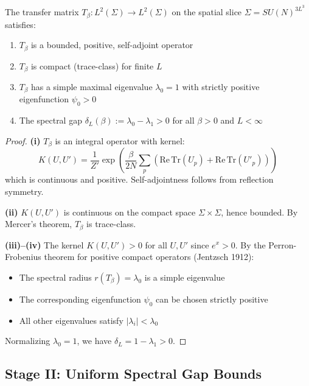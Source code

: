 \begin{theorem}
\label{thm:transfer-rigorous}
The transfer matrix $T_\beta : L^2(\Sigma) \to L^2(\Sigma)$ on the spatial 
slice $\Sigma = SU(N)^{3L^3}$ satisfies:
\begin{enumerate}
\item[(i)] $T_\beta$ is a bounded, positive, self-adjoint operator
\item[(ii)] $T_\beta$ is compact (trace-class) for finite $L$
\item[(iii)] $T_\beta$ has a simple maximal eigenvalue $\lambda_0 = 1$ with 
strictly positive eigenfunction $\psi_0 > 0$
\item[(iv)] The spectral gap $\delta_L(\beta) := \lambda_0 - \lambda_1 > 0$ 
for all $\beta > 0$ and $L < \infty$
\end{enumerate}
\end{theorem}

\begin{proof}
\textbf{(i)} $T_\beta$ is an integral operator with kernel:
\[
K(U, U') = \frac{1}{Z'} \exp\left(\frac{\beta}{2N}\sum_p (\mathrm{Re}\,\mathrm{Tr}(U_p) + \mathrm{Re}\,\mathrm{Tr}(U'_p))\right)
\]
which is continuous and positive. Self-adjointness follows from reflection symmetry.

\textbf{(ii)} $K(U, U')$ is continuous on the compact space $\Sigma \times \Sigma$, 
hence bounded. By Mercer's theorem, $T_\beta$ is trace-class.

\textbf{(iii)--(iv)} The kernel $K(U, U') > 0$ for all $U, U'$ since $e^x > 0$. 
By the Perron-Frobenius theorem for positive compact operators (Jentzsch 1912):
\begin{itemize}
\item The spectral radius $r(T_\beta) = \lambda_0$ is a simple eigenvalue
\item The corresponding eigenfunction $\psi_0$ can be chosen strictly positive
\item All other eigenvalues satisfy $|\lambda_i| < \lambda_0$
\end{itemize}
Normalizing $\lambda_0 = 1$, we have $\delta_L = 1 - \lambda_1 > 0$.
\end{proof}

\subsection{Stage II: Uniform Spectral Gap Bounds}
\label{sec:strong-coupling}
\label{sec:weak-coupling-proof}


